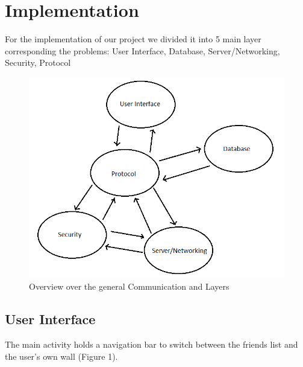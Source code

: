 \documentclass{report}
\begin{document}
\section{Implementation}
For the implementation of our project we divided it into 5 main layer corresponding the problems: User Interface, Database, Server/Networking, Security, Protocol

\begin{figure}[H]
\vspace{-2mm} %
	\centering
    \includegraphics[width=\columnwidth]{Architecture.png}

    
    \caption{Overview over the general Communication and Layers}
\end{figure}

\subsection{User Interface}

The main activity holds a navigation bar to switch between the friends list and the user's own wall (Figure 1).
\end{document}
